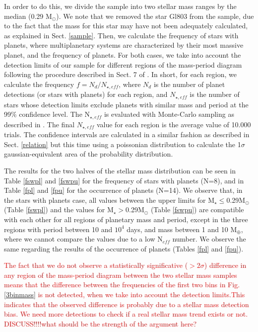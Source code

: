 \documentclass[structabstract]{aa}
\begin{document}
In order to do this, we divide the sample into two stellar mass ranges by the median (0.29 M$_{\odot}$). We note that we removed the star Gl803 from the sample, due to the fact that the mass for this star may have not been adequately calculated, as explained in Sect. \ref{sample}. Then, we calculate the frequency of stars with planets, where multiplanetary systems are characterized by their most massive planet, and the frequency of planets. For both cases, we take into account the detection limits of our sample for different regions of the mass-period diagram following the procedure described in Sect. 7 of \citet{Bonfils-2011}. In short, for each region, we calculate the frequency $f=N_{d}/N_{\star,eff}$, where $N_{d}$ is the number of planet detections (or stars with planets) for each region, and $N_{\star,eff}$ is the number of stars whose detection limits exclude planets with similar mass and period at the 99\% confidence level. The N$_{\star,eff}$ is evaluated with Monte-Carlo sampling as described in \citet{Bonfils-2011}. The final $N_{\star,eff}$ value for each region is the average value of 10.000 trials. The confidence intervals are calculated in a similar fashion as described in Sect. \ref{relation} but this time using a poissonian distribution to calculate the 1$\sigma$ gaussian-equivalent area of the probability distribution.%

The results for the two halves of the stellar mass distribution can be seen in Table \ref{fswpl} and \ref{fswpu} for the frequency of stars with planets (N=8), and in Table \ref{fpl} and \ref{fpu} for the occurrence of planets (N=14). We observe that, in the stars with planets case, all values between the upper limits for M$_{\star} \le $0.29M$_{\odot}$ (Table \ref{fswpl}) and the values  for M$_{\star} > $0.29M$_{\odot}$ (Table \ref{fswpu}) are compatible with each other for all regions of planetary mass and period, except in the three regions with period between 10 and $10^{4}$ days, and mass between 1 and 10 M$_{\oplus}$, where we cannot compare the values due to a low N$_{eff}$ number. We observe the same regarding the results of the occurrence of planets (Tables \ref{fpl} and \ref{fpu}). 

\textcolor{red}{The fact that we do not observe a statistically significative ($> 2\sigma$) difference in any region of the mass-period diagram between the two stellar mass samples means that the difference between the frequencies of the first two bins in Fig. \ref{3binmass} is not detected, when we take into account the detection limits.This indicates that the observed difference is probably due to a stellar mass detection bias. We need more detections to check if a real stellar mass trend exists or not. DISCUSS!!!!what should be the strength of the argument here?}
\end{document}
